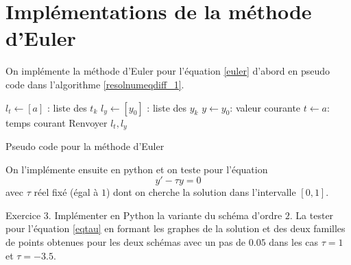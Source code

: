 \section{Implémentations de la méthode d'Euler}
On implémente la méthode d'Euler pour l'équation \eqref{euler} d'abord en pseudo code dans l'algorithme \ref{resolnumeqdiff_1}. 
\begin{algorithm}[h]
  $l_t\leftarrow [a]$ : liste des $t_k$\;
  $l_y\leftarrow [y_0]$ : liste des $y_k$\;
  $y\leftarrow y_0$: valeur courante \;
  $t\leftarrow a$: temps courant \;
  Renvoyer $l_t , l_y$\;
  \caption{Pseudo code pour la méthode d'Euler}
  \label{resolnumeqdiff_1}
\end{algorithm}
On l'implémente ensuite en python et on teste pour l'équation
\begin{equation}
  y' - \tau y =0
  \label{eqtau}
\end{equation}
avec $\tau$ réel fixé (égal à $1$) dont on cherche la solution dans l'intervalle $[0,1]$.


Exercice 3. Implémenter en Python la variante du schéma d'ordre $2$. La tester pour l'équation \eqref{eqtau} en formant les graphes de la solution et des deux familles de points obtenues pour les deux schémas avec un pas de $0.05$ dans les cas $\tau=1$ et $\tau=-3.5$.

